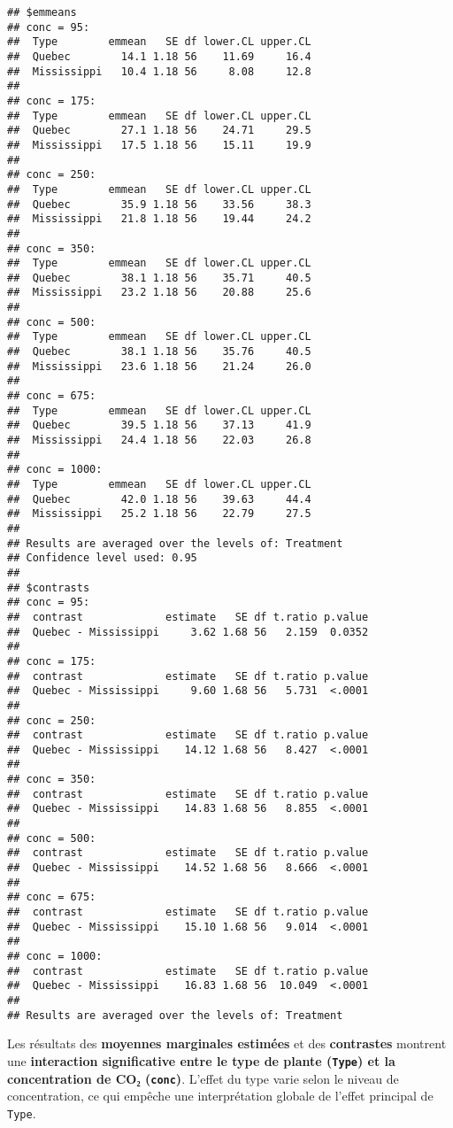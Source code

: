 \documentclass[
]{article}
\begin{document}
\begin{verbatim}
## $emmeans
## conc = 95:
##  Type        emmean   SE df lower.CL upper.CL
##  Quebec        14.1 1.18 56    11.69     16.4
##  Mississippi   10.4 1.18 56     8.08     12.8
## 
## conc = 175:
##  Type        emmean   SE df lower.CL upper.CL
##  Quebec        27.1 1.18 56    24.71     29.5
##  Mississippi   17.5 1.18 56    15.11     19.9
## 
## conc = 250:
##  Type        emmean   SE df lower.CL upper.CL
##  Quebec        35.9 1.18 56    33.56     38.3
##  Mississippi   21.8 1.18 56    19.44     24.2
## 
## conc = 350:
##  Type        emmean   SE df lower.CL upper.CL
##  Quebec        38.1 1.18 56    35.71     40.5
##  Mississippi   23.2 1.18 56    20.88     25.6
## 
## conc = 500:
##  Type        emmean   SE df lower.CL upper.CL
##  Quebec        38.1 1.18 56    35.76     40.5
##  Mississippi   23.6 1.18 56    21.24     26.0
## 
## conc = 675:
##  Type        emmean   SE df lower.CL upper.CL
##  Quebec        39.5 1.18 56    37.13     41.9
##  Mississippi   24.4 1.18 56    22.03     26.8
## 
## conc = 1000:
##  Type        emmean   SE df lower.CL upper.CL
##  Quebec        42.0 1.18 56    39.63     44.4
##  Mississippi   25.2 1.18 56    22.79     27.5
## 
## Results are averaged over the levels of: Treatment 
## Confidence level used: 0.95 
## 
## $contrasts
## conc = 95:
##  contrast             estimate   SE df t.ratio p.value
##  Quebec - Mississippi     3.62 1.68 56   2.159  0.0352
## 
## conc = 175:
##  contrast             estimate   SE df t.ratio p.value
##  Quebec - Mississippi     9.60 1.68 56   5.731  <.0001
## 
## conc = 250:
##  contrast             estimate   SE df t.ratio p.value
##  Quebec - Mississippi    14.12 1.68 56   8.427  <.0001
## 
## conc = 350:
##  contrast             estimate   SE df t.ratio p.value
##  Quebec - Mississippi    14.83 1.68 56   8.855  <.0001
## 
## conc = 500:
##  contrast             estimate   SE df t.ratio p.value
##  Quebec - Mississippi    14.52 1.68 56   8.666  <.0001
## 
## conc = 675:
##  contrast             estimate   SE df t.ratio p.value
##  Quebec - Mississippi    15.10 1.68 56   9.014  <.0001
## 
## conc = 1000:
##  contrast             estimate   SE df t.ratio p.value
##  Quebec - Mississippi    16.83 1.68 56  10.049  <.0001
## 
## Results are averaged over the levels of: Treatment
\end{verbatim}

Les résultats des \textbf{moyennes marginales estimées} et des
\textbf{contrastes} montrent une \textbf{interaction significative entre
le type de plante (\texttt{Type}) et la concentration de CO₂
(\texttt{conc})}. L'effet du type varie selon le niveau de
concentration, ce qui empêche une interprétation globale de l'effet
principal de \texttt{Type}.
\end{document}
